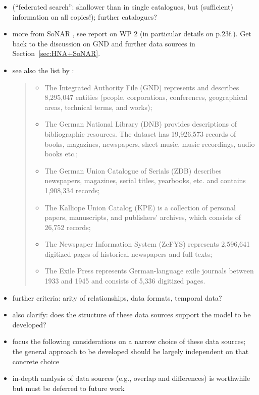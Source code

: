 \begin{itemize}
  \item
     (\enquote{federated search}: shallower than in single catalogues,
    but (sufficient) information on all copies!);
    further catalogues?
  \item
    more from \gls{SoNAR} , see report on WP 2 (in particular details on p.23f.).
    Get back to the discussion on \gls{GND} and further data sources in Section~\ref{sec:HNA+SoNAR}.
  \item
    see also the list by \autocite{Menzel2020}:

    \blockquote{%
      \begin{itemize}
        \item
          The Integrated Authority File (GND) represents and describes 8,295,047 entities (people, corporations, conferences, geographical areas, technical terms, and works);
        \item
          The German National Library (DNB) provides descriptions of bibliographic resources. The dataset has 19,926,573 records of books, magazines, newspapers, sheet music, music recordings, audio books etc.;
        \item
          The German Union Catalogue of Serials (ZDB) describes newspapers, magazines, serial titles, yearbooks, etc. and contains 1,908,334 records;
        \item
          The Kalliope Union Catalog (KPE) is a collection of personal papers, manuscripts, and publishers’ archives, which consists of 26,752 records;
        \item
          The Newspaper Information System (ZeFYS) represents 2,596,641 digitized pages of historical newspapers and full texts;
        \item
          The Exile Press represents German-language exile journals between 1933 and 1945 and consists of 5,336 digitized pages.
      \end{itemize}
    }
  \item
    further criteria: arity of relationships, data formats, temporal data?
  \item
    also clarify: does the structure of these data sources support the model to be developed?
  \item
    focus the following considerations on a narrow choice of these data sources;
    the general approach to be developed should be largely independent on that concrete choice
  \item 
    in-depth analysis of data sources (e.g., overlap and differences) is worthwhile
    but must be deferred to future work
\end{itemize}

